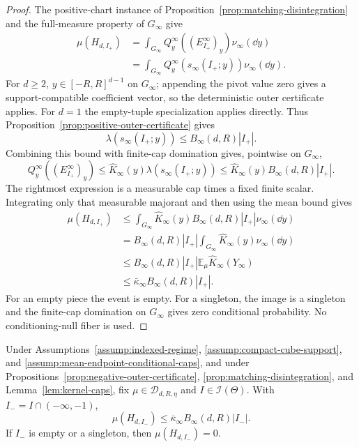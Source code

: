 \begin{proof}
The positive-chart instance of Proposition~\ref{prop:matching-disintegration}
and the full-measure property of $G_\infty$ give
\[
\begin{aligned}
\mu(H_{d,I_+})
&=\int_{G_\infty}Q^\infty_y((E^\infty_{I_+})_y)\nu_\infty(\dd y)\\
&=\int_{G_\infty}Q^\infty_y(s_\infty(I_+;y))\nu_\infty(\dd y).
\end{aligned}
\]
For $d\geq2$, $y\in[-R,R]^{d-1}$ on $G_\infty$; appending the pivot value
zero gives a support-compatible coefficient vector, so the deterministic
outer certificate applies.  For $d=1$ the empty-tuple specialization applies
directly.  Thus
Proposition~\ref{prop:positive-outer-certificate} gives
\[
\lambda(s_\infty(I_+;y))\leq B_\infty(d,R)|I_+|.
\]
Combining this bound with finite-cap domination gives, pointwise on
$G_\infty$,
\[
Q^\infty_y((E^\infty_{I_+})_y)
\leq\widehat K_\infty(y)\lambda(s_\infty(I_+;y))
\leq\widehat K_\infty(y)B_\infty(d,R)|I_+|.
\]
The rightmost expression is a measurable cap times a fixed finite scalar.
Integrating only that measurable majorant and then using the mean bound gives
\[
\begin{aligned}
\mu(H_{d,I_+})
&\leq\int_{G_\infty}\widehat K_\infty(y)B_\infty(d,R)|I_+|
       \nu_\infty(\dd y)\\
&= B_\infty(d,R)|I_+|
       \int_{G_\infty}\widehat K_\infty(y)\nu_\infty(\dd y)\\
&\leq B_\infty(d,R)|I_+|
       \mathbb E_\mu\widehat K_\infty(Y_\infty)\\
&\leq\bar\kappa_\infty B_\infty(d,R)|I_+|.
\end{aligned}
\]
For an empty piece the event is empty.  For a singleton, the image is a
singleton and the finite-cap domination on $G_\infty$ gives zero conditional
probability.  No conditioning-null fiber is used.
\end{proof}

\begin{proposition}
\label{prop:negative-chart-probability}
Under Assumptions~\ref{assump:indexed-regime},
\ref{assump:compact-cube-support}, and
\ref{assump:mean-endpoint-conditional-caps}, and under
Propositions~\ref{prop:negative-outer-certificate},
\ref{prop:matching-disintegration}, and Lemma~\ref{lem:kernel-caps}, fix
$\mu\in\mathcal D_{d,R,\eta}$ and $I\in\mathcal I(\Theta)$.  With
$I_-=I\cap(-\infty,-1)$,
\[
\mu(H_{d,I_-})\leq\bar\kappa_\infty B_\infty(d,R)|I_-|.
\]
If $I_-$ is empty or a singleton, then $\mu(H_{d,I_-})=0$.
\end{proposition}

